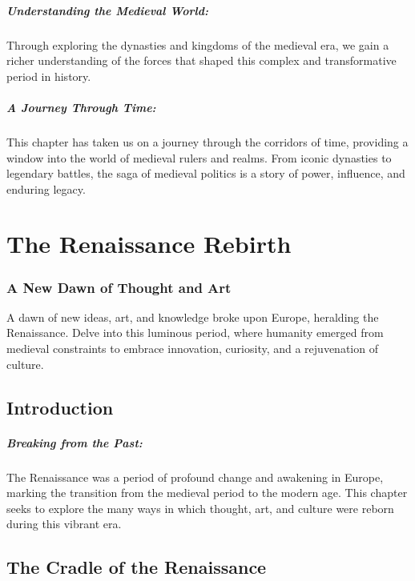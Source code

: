 \documentclass[a4paper,12pt]{book}
\begin{document}
\paragraph{Understanding the Medieval World:}
Through exploring the dynasties and kingdoms of the medieval era, we gain a richer understanding of the forces that shaped this complex and transformative period in history.

\paragraph{A Journey Through Time:}
This chapter has taken us on a journey through the corridors of time, providing a window into the world of medieval rulers and realms. From iconic dynasties to legendary battles, the saga of medieval politics is a story of power, influence, and enduring legacy.

\chapter{The Renaissance Rebirth}
\subsection*{A New Dawn of Thought and Art}
A dawn of new ideas, art, and knowledge broke upon Europe, heralding the Renaissance. Delve into this luminous period, where humanity emerged from medieval constraints to embrace innovation, curiosity, and a rejuvenation of culture.

\section*{Introduction}

\paragraph{Breaking from the Past:}
The Renaissance was a period of profound change and awakening in Europe, marking the transition from the medieval period to the modern age. This chapter seeks to explore the many ways in which thought, art, and culture were reborn during this vibrant era.

\section*{The Cradle of the Renaissance}
\end{document}
